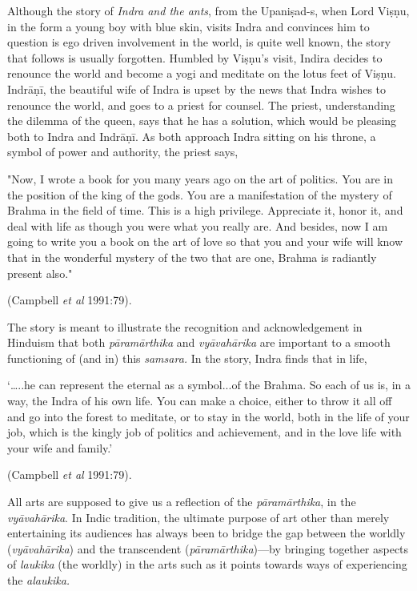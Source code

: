 Although the story of \textsl{Indra and the ants}, from the Upaniṣad-s, when Lord Viṣṇu, in the form a young boy with blue skin, visits Indra and convinces him to question is ego driven involvement in the world, is quite well known, the story that follows is usually forgotten. Humbled by Viṣṇu's visit, Indira decides to renounce the world and become a yogi and meditate on the lotus feet of Viṣṇu. Indrāṇī, the beautiful wife of Indra is upset by the news that Indra wishes to renounce the world, and goes to a priest for counsel. The priest, understanding the dilemma of the queen, says that he has a solution, which would be pleasing both to Indra and Indrāṇī. As both approach Indra sitting on his throne, a symbol of power and authority, the priest says, 

\begin{myquote}
"Now, I wrote a book for you many years ago on the art of politics. You are in the position of the king of the gods. You are a manifestation of the mystery of Brahma in the field of time. This is a high privilege. Appreciate it, honor it, and deal with life as though you were what you really are. And besides, now I am going to write you a book on the art of love so that you and your wife will know that in the wonderful mystery of the two that are one, Brahma is radiantly present also." 

\hfill (Campbell \textsl{et al} 1991:79).
\end{myquote}

The story is meant to illustrate the recognition and acknowledgement in Hinduism that both \textsl{pāramārthika} and \textsl{vyāvahārika} are important to a smooth functioning of (and in) this \textsl{samsara.} In the story, Indra finds that in life, 

\begin{myquote}
‘…..he can represent the eternal as a symbol...of the Brahma. So each of us is, in a way, the Indra of his own life. You can make a choice, either to throw it all off and go into the forest to meditate, or to stay in the world, both in the life of your job, which is the kingly job of politics and achievement, and in the love life with your wife and family.’

\hfill (Campbell \textsl{et al} 1991:79).
\end{myquote}

All arts are supposed to give us a reflection of the \textsl{pāramārthika}, in the \textsl{vyāvahārika}. In Indic tradition, the ultimate purpose of art other than merely entertaining its audiences has always been to bridge the gap between the worldly (\textsl{vyāvahārika}) and the transcendent (\textsl{pāramārthika})---by bringing together aspects of \textsl{laukika} (the worldly) in the arts such as it points towards ways of experiencing the \textsl{alaukika.}



